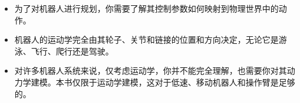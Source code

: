 
\begin{itemize}
\item 为了对机器人进行规划，你需要了解其控制参数如何映射到物理世界中的动作。
\item 机器人的运动学完全由其轮子、关节和链接的位置和方向决定，无论它是游泳、飞行、爬行还是驾驶。
\item 对许多机器人系统来说，仅考虑运动学，你并不能完全理解，也需要你对其动力学建模。本书仅限于运动学建模，这对于低速、移动机器人和操作臂是足够的。
\end{itemize} 


